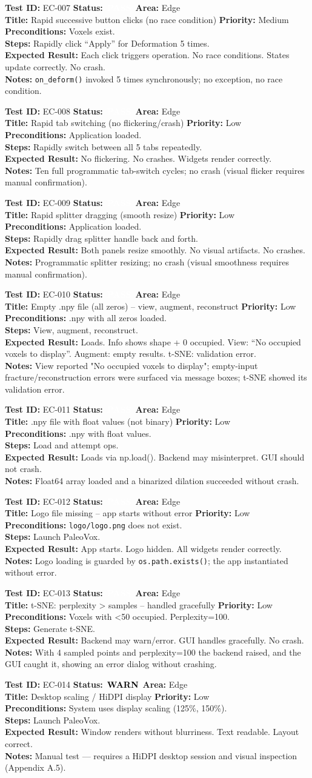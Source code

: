\documentclass[12pt,a4paper]{article}
\newcommand{\statuspass}{\colorbox{statusgreen}{\textcolor{white}{\textbf{\,PASS\,}}}}
\newcommand{\statuswarn}{\colorbox{statusyellow}{\textcolor{black}{\textbf{\,WARN\,}}}}
\newcommand{\testcase}[9]{%
  \smallskip
  \noindent\textbf{Test ID:} #1 \hfill \textbf{Status:} #2 \hfill \textbf{Area:} #3 \\
  \textbf{Title:} #4 \hfill \textbf{Priority:} #5 \\[0.3em]
  \textbf{Preconditions:} #6 \\[0.3em]
  \textbf{Steps:} #7 \\[0.3em]
  \textbf{Expected Result:} #8 \\
  \textbf{Notes:} #9
  \smallskip
}
\begin{document}
\testcase{EC-007}{\statuspass}{Edge}{Rapid successive button clicks (no race condition)}{Medium}{Voxels exist.}{Rapidly click ``Apply'' for Deformation 5 times.}{Each click triggers operation. No race conditions. States update correctly. No crash.}{\texttt{on\_deform()} invoked 5 times synchronously; no exception, no race condition.}


\testcase{EC-008}{\statuspass}{Edge}{Rapid tab switching (no flickering/crash)}{Low}{Application loaded.}{Rapidly switch between all 5 tabs repeatedly.}{No flickering. No crashes. Widgets render correctly.}{Ten full programmatic tab-switch cycles; no crash (visual flicker requires manual confirmation).}


\testcase{EC-009}{\statuspass}{Edge}{Rapid splitter dragging (smooth resize)}{Low}{Application loaded.}{Rapidly drag splitter handle back and forth.}{Both panels resize smoothly. No visual artifacts. No crashes.}{Programmatic splitter resizing; no crash (visual smoothness requires manual confirmation).}


\testcase{EC-010}{\statuspass}{Edge}{Empty .npy file (all zeros) -- view, augment, reconstruct}{Low}{.npy with all zeros loaded.}{View, augment, reconstruct.}{Loads. Info shows shape + 0 occupied. View: ``No occupied voxels to display''. Augment: empty results. t-SNE: validation error.}{View reported "No occupied voxels to display"; empty-input fracture/reconstruction errors were surfaced via message boxes; t-SNE showed its validation error.}


\testcase{EC-011}{\statuspass}{Edge}{.npy file with float values (not binary)}{Low}{.npy with float values.}{Load and attempt ops.}{Loads via np.load(). Backend may misinterpret. GUI should not crash.}{Float64 array loaded and a binarized dilation succeeded without crash.}


\testcase{EC-012}{\statuspass}{Edge}{Logo file missing -- app starts without error}{Low}{\texttt{logo/logo.png} does not exist.}{Launch PaleoVox.}{App starts. Logo hidden. All widgets render correctly.}{Logo loading is guarded by \texttt{os.path.exists()}; the app instantiated without error.}


\testcase{EC-013}{\statuspass}{Edge}{t-SNE: perplexity > samples -- handled gracefully}{Low}{Voxels with <50 occupied. Perplexity=100.}{Generate t-SNE.}{Backend may warn/error. GUI handles gracefully. No crash.}{With 4 sampled points and perplexity=100 the backend raised, and the GUI caught it, showing an error dialog without crashing.}


\testcase{EC-014}{\statuswarn}{Edge}{Desktop scaling / HiDPI display}{Low}{System uses display scaling (125\%, 150\%).}{Launch PaleoVox.}{Window renders without blurriness. Text readable. Layout correct.}{Manual test --- requires a HiDPI desktop session and visual inspection (Appendix A.5).}
\end{document}
